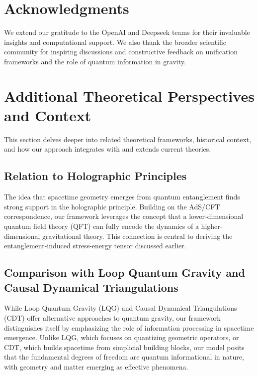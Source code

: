 \documentclass[12pt, a4paper]{article}
\begin{document}
\section*{Acknowledgments}
We extend our gratitude to the OpenAI and Deepseek teams for their invaluable insights and computational support. We also thank the broader scientific community for inspiring discussions and constructive feedback on unification frameworks and the role of quantum information in gravity.

\section{Additional Theoretical Perspectives and Context}
This section delves deeper into related theoretical frameworks, historical context, and how our approach integrates with and extends current theories.

\subsection{Relation to Holographic Principles}
The idea that spacetime geometry emerges from quantum entanglement finds strong support in the holographic principle. Building on the AdS/CFT correspondence, our framework leverages the concept that a lower-dimensional quantum field theory (QFT) can fully encode the dynamics of a higher-dimensional gravitational theory. This connection is central to deriving the entanglement-induced stress-energy tensor discussed earlier.

\subsection{Comparison with Loop Quantum Gravity and Causal Dynamical Triangulations}
While Loop Quantum Gravity (LQG) and Causal Dynamical Triangulations (CDT) offer alternative approaches to quantum gravity, our framework distinguishes itself by emphasizing the role of information processing in spacetime emergence. Unlike LQG, which focuses on quantizing geometric operators, or CDT, which builds spacetime from simplicial building blocks, our model posits that the fundamental degrees of freedom are quantum informational in nature, with geometry and matter emerging as effective phenomena.
\end{document}
